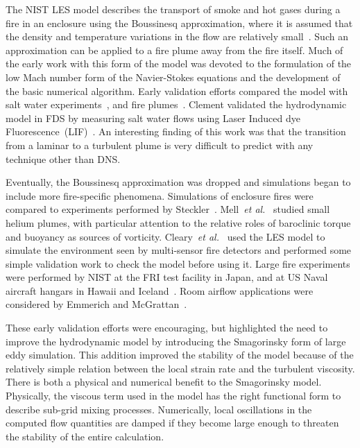 The NIST LES model describes the transport of smoke and hot gases during a fire in an enclosure using the Boussinesq approximation, where it is assumed that the density and temperature variations in the flow are relatively small~\cite{Rehm:1,Rehm:SIAM83,Rehm:ANM85,Rehm:IAFSS3}. Such an approximation can be applied to a fire plume away from the fire itself. Much of the early work with this form of the model was devoted to the formulation of the low Mach number form of the Navier-Stokes equations and the development of the basic numerical algorithm.  Early validation efforts compared the model with salt water experiments~\cite{Baum:1,McGrattan:1,Rehm:IAFSS5},  and fire plumes~\cite{Baum:IAFSS5,Baum:2,Baum:3,Baum:4}. Clement validated the hydrodynamic model in FDS by measuring salt water flows using Laser Induced dye  Fluorescence~(LIF)~\cite{Clement:1}. An  interesting finding of this work was that the transition from a laminar to a turbulent plume is very difficult to predict with any technique other than DNS.

Eventually, the Boussinesq approximation was dropped and simulations began to  include more fire-specific  phenomena. Simulations of enclosure  fires  were  compared  to experiments  performed  by Steckler~\cite{McGrattan:4}. Mell~{\em et al.}~\cite{Mell:1} studied small helium plumes, with particular attention to the relative roles of baroclinic torque and buoyancy as sources of vorticity. Cleary~{\em et
al.}~\cite{LES:6} used  the LES model to simulate the environment seen by multi-sensor fire detectors and performed some simple validation work to check the model before using it. Large fire experiments were performed by NIST at the FRI test facility in Japan, and at US Naval aircraft hangars in Hawaii and Iceland~\cite{Davis:1}. Room  airflow  applications  were  considered by  Emmerich  and McGrattan~\cite{Emmerich:1,Emmerich:2}.

These early validation efforts were encouraging, but highlighted the need to improve the hydrodynamic model by introducing the Smagorinsky form of large eddy simulation. This addition improved the stability of the model because of the relatively simple relation between the local strain rate and the turbulent viscosity. There is both  a  physical and  numerical  benefit  to the  Smagorinsky model. Physically, the viscous term used in the model has the right functional form to describe sub-grid mixing processes. Numerically, local oscillations in the computed flow quantities are damped if they become large  enough to threaten the stability  of the entire calculation.






